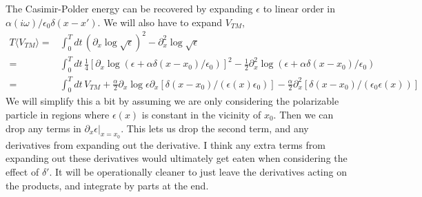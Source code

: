 The Casimir-Polder energy can be recovered by expanding $\epsilon$ to linear order in $\alpha(i\omega)/\epsilon_0\delta(x-x').$
  We will also have to expand $V_{TM}$,
\begin{align}
T\langle V_{TM}\rangle =& \int_0^Tdt\, (\partial_x\log\sqrt{\epsilon})^2 - \partial_x^2\log\sqrt{\epsilon}\\
=& \int_0^Tdt\, \frac{1}{4}[\partial_x\log(\epsilon + \alpha\delta(x-x_0)/\epsilon_0)]^2 
- \frac{1}{2}\partial_x^2\log(\epsilon + \alpha\delta(x-x_0)/\epsilon_0)\\
=& \int_0^Tdt\, V_{TM} +\frac{\alpha}{2}\partial_x\log\epsilon\partial_x[\delta(x-x_0)/(\epsilon(x)\epsilon_0)]
 - \frac{\alpha}{2}\partial_x^2[\delta(x-x_0)/(\epsilon_0\epsilon(x))]
\end{align}
We will simplify this a bit by assuming we are only considering the polarizable particle in regions 
where $\epsilon(x)$ is constant in the vicinity of $x_0$.
  Then we can drop any terms in $\partial_x\epsilon|_{x=x_0}$.
  This lets us drop the second term, and any derivatives from expanding out the derivative.
  I think any extra terms from expanding out these derivatives would ultimately get eaten when
 considering the effect of $\delta'$.
  It will be operationally cleaner to just leave the derivatives acting on the products, 
and integrate by parts at the end. 

